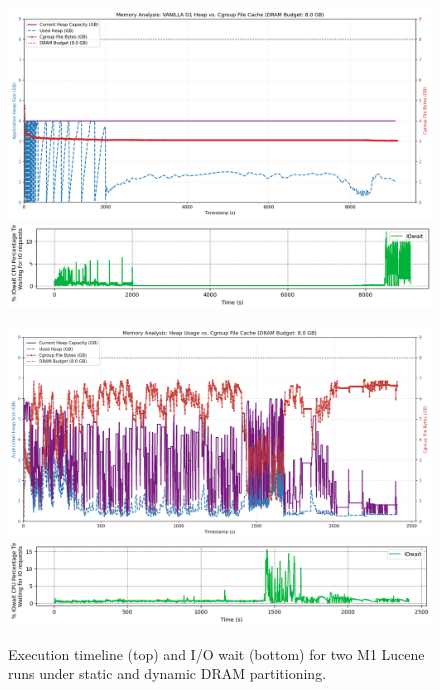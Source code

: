 \begin{figure}[!t]
    \centering

    \begin{minipage}[t]{0.49\textwidth}
        \centering
        \includegraphics[width=\linewidth]{fig/combined_memory_timeline_vanilla_g1.png}
        \vspace{0.5em}
        \includegraphics[width=\linewidth]{fig/iow_cpu_teraheap.png}
        \label{fig:lucene-m1_th}
    \end{minipage}
    \hfill
    \begin{minipage}[t]{0.49\textwidth}
        \centering
        \includegraphics[width=\linewidth]{fig/flexheap_debug.png}
        \vspace{0.5em}
        \includegraphics[width=\linewidth]{fig/iow_cpu_flex.png}
        \label{fig:lucene-m1_flex}
    \end{minipage}

    \caption{Execution timeline (top) and I/O wait (bottom) for two M1 Lucene runs under static and dynamic DRAM partitioning.}
    \label{fig:lucene_m1}
\end{figure}

